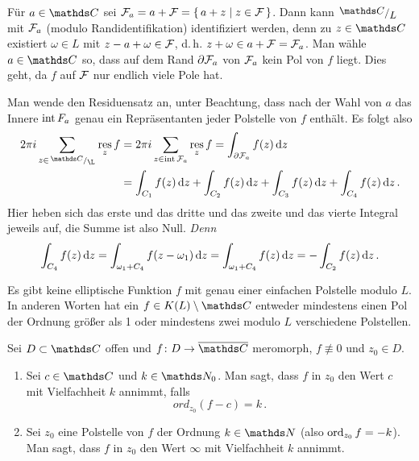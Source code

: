 \begin{bewe}
Für $a\in\CC$ sei $\mathcal{F}_a = a + \mathcal{F} = \left\{\,a + z \mid z\in\mathcal{F}\,\right\}$.
Dann kann $\modulo{\CC}{L}$ mit $\mathcal{F}_a$ (modulo Randidentifikation) identifiziert werden, denn zu $z\in\CC$ existiert $\omega \in L$ mit $z-a+\omega \in \mathcal{F}$, d.\,h. $z+\omega \in a + \mathcal{F} = \mathcal{F}_a$.
Man wähle $a\in\CC$ so, dass auf dem Rand $\partial \mathcal{F}_a$ von $\mathcal{F}_a$ kein Pol von $f$ liegt.
Dies geht, da $f$ auf $\mathcal{F}$ nur endlich viele Pole hat.

Man wende den Residuensatz an, unter Beachtung, dass nach der Wahl von $a$ das Innere $\operatorname{int} F_a$ genau ein Repräsentanten jeder Polstelle von $f$ enthält.
Es folgt also
\begin{align*}
	2\pi i \sum_{z\in\modulo{\CC}{\L}} \res_z f
	&= 2\pi i \sum_{z\in \innere \F_a} \res_z f
	= \int_{\partial \F_a} f(z)\opd z \\
	&= \int_{C_1} f(z) \opd z + \int_{C_2} f(z) \opd z + \int_{C_3} f(z) \opd z + \int_{C_4} f(z) \opd z
	\,.
\end{align*}
Hier heben sich das erste und das dritte und das zweite und das vierte Integral jeweils auf, die Summe ist also Null.
\emph{Denn}
\[
	\int_{C_4} f(z)\,\mathrm{d} z
	= \int_{\omega_1 + C_4} f(z-\omega_1) \,\mathrm{d} z
	= \int_{\omega_1 + C_4} f(z)\,\mathrm{d} z
	= -\int_{C_2} f(z) \,\mathrm{d} z
	\,.
\]
\end{bewe}

\begin{koro}
Es gibt keine elliptische Funktion $f$ mit genau einer einfachen Polstelle modulo $L$.
In anderen Worten hat ein $f\in K(L)\setminus\CC$ entweder mindestens einen Pol der Ordnung größer als 1 oder mindestens zwei modulo $L$ verschiedene Polstellen.
\end{koro}

\begin{defi-noind}
Sei $D \subset \CC$ offen und $f\colon D \ra \closure \CC$ meromorph, $f \not\equiv 0$ und $z_0 \in D$.
\begin{enumerate}
\item Sei $c\in \CC$ und $k\in\NN_0$.
Man sagt, dass $f$ in $z_0$ den Wert $c$ mit Vielfachheit $k$ annimmt, falls
\[
	ord_{z_0} (f-c) = k
	\,.
\]

\item Sei $z_0$ eine Polstelle von $f$ der Ordnung $k\in\NN$ (also $\operatorname*{ord}_{z_0} f = -k$).
Man sagt, dass $f$ in $z_0$ den Wert $\infty$ mit Vielfachheit $k$ annimmt.
\end{enumerate}
\end{defi-noind}

